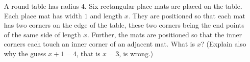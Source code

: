 A round table has radius $4$. Six rectangular place mats are placed on the table. Each place mat has width $1$ and length $x$. They are positioned so that each mat has two corners on the edge of the table, these two corners being the end points of the same side of length $x$. Further, the mats are positioned so that the inner corners each touch an inner corner of an adjacent mat. What is $x$? (Explain also why the guess $x+1=4$, that is $x=3$, is wrong.)
